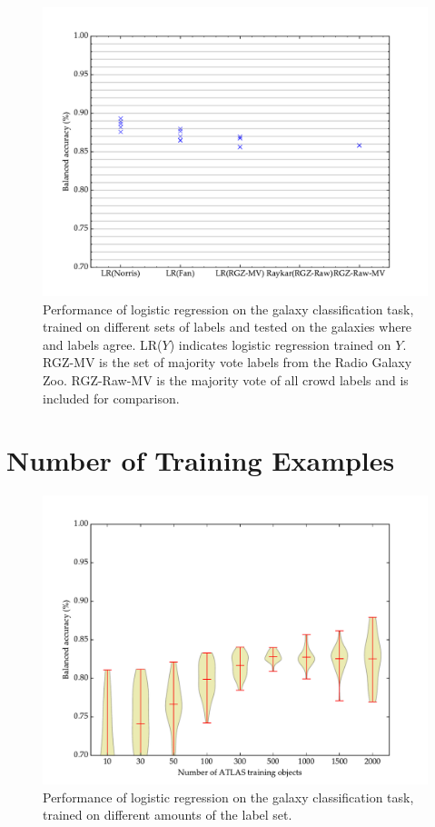   \begin{figure}[!ht]
    \centering
    \includegraphics[width=\textwidth]{images/experiments/predictors.pdf}
    \caption{Performance of logistic regression on the galaxy classification
      task, trained on different sets of labels and tested on the galaxies
      where \citeauthor{norris06} and \citeauthor{fan15} labels agree. LR($Y$)
      indicates logistic regression trained on $Y$. RGZ-MV is the set of
      majority vote labels from the Radio Galaxy Zoo. RGZ-Raw-MV is the
      majority vote of all crowd labels and is included for comparison.}
  \end{figure}

\section{Number of Training Examples}

  \begin{figure}[!ht]
    \centering
    \includegraphics[width=\textwidth]{images/experiments/passive.pdf}
    \caption{Performance of logistic regression on the galaxy classification
      task, trained on different amounts of the \citeauthor{norris06} label
      set.}
  \end{figure}

